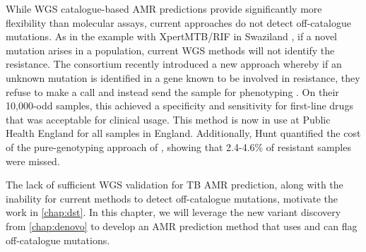 \noindent
While WGS catalogue-based AMR predictions provide significantly more flexibility than molecular assays, current approaches do not detect off-catalogue mutations. As in the example with Xpert\textregistered MTB/RIF in Swaziland \cite{Sanchez2015}, if a novel mutation arises in a population, current WGS methods will not identify the resistance. The \cryptic{} consortium recently introduced a new approach whereby if an unknown mutation is identified in a gene known to be involved in resistance, they refuse to make a call and instead send the sample for phenotyping \cite{cryptic2018}. On their 10,000-odd samples, this achieved a specificity and sensitivity for first-line drugs that was acceptable for clinical usage. This method is now in use at Public Health England for all \mtb{} samples in England. Additionally, Hunt \etal{} quantified the cost of the pure-genotyping approach of \mykrobe{}, showing that 2.4-4.6\% of resistant samples were missed. 


\noindent
The lack of sufficient \ont{} WGS validation for TB AMR prediction, along with the inability for current methods to detect off-catalogue mutations, motivate the work in \autoref{chap:dst}. In this chapter, we will leverage the new \denovo{} variant discovery from \autoref{chap:denovo} to develop an AMR prediction method that uses \pandora{} and can flag off-catalogue mutations.

